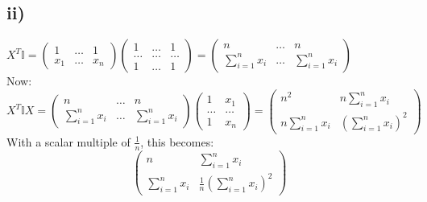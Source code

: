 \documentclass{article}
\begin{document}
\subsection*{ii)}
$
X^T\mathbb{I} = \begin{pmatrix}
    1 & \dots & 1 \\ 
    x_1 & \dots & x_n
\end{pmatrix}
\begin{pmatrix}
    1 & \dots & 1 \\ 
    \dots & \dots & \dots \\ 
    1 & \dots & 1
\end{pmatrix} = 
\begin{pmatrix}
    n & \dots & n \\ 
    \sum_{i=1}^n x_i & \dots & \sum_{i=1}^n x_i
\end{pmatrix}
$ \\ 
Now: \\ 
$
X^T\mathbb{I}X = \begin{pmatrix}
    n & \dots & n \\ 
    \sum_{i=1}^n x_i & \dots & \sum_{i=1}^n x_i
\end{pmatrix} \begin{pmatrix}
    1 & x_1 \\ 
    \dots & \dots \\ 
    1 & x_n
\end{pmatrix} = \begin{pmatrix}
    n^2 & n\sum_{i=1}^n x_i \\ 
    n\sum_{i=1}^n x_i & \left( \sum_{i=1}^n x_i\right)^2
\end{pmatrix}
$ \\ 
With a scalar multiple of $\frac{1}{n}$, this becomes:
$$ 
\begin{pmatrix}
    n & \sum_{i=1}^nx_i \\
    \sum_{i=1}^nx_i & \frac{1}{n}\left(\sum_{i=1}^nx_i\right)^2
\end{pmatrix}
$$
\end{document}
